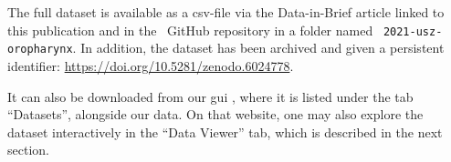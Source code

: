 \begin{tcolorbox}[
    title=\faIcon{database} Data,
    parbox=false,
    float
]
    The full dataset is available as a \acrshort{csv}-file via the Data-in-Brief article linked to this publication \cite{ludwig_dataset_2022} and in the ~GitHub repository  in a folder named ~\texttt{2021-usz-oropharynx}. In addition, the dataset has been archived and given a persistent identifier: \url{https://doi.org/10.5281/zenodo.6024778}.

    It can also be downloaded from our \gls{gui} \inlinelyproxlogo{}, where it is listed under the tab ``Datasets'', alongside our data. On that website, one may also explore the dataset interactively in the ``Data Viewer'' tab, which is described in the next section.
\end{tcolorbox}